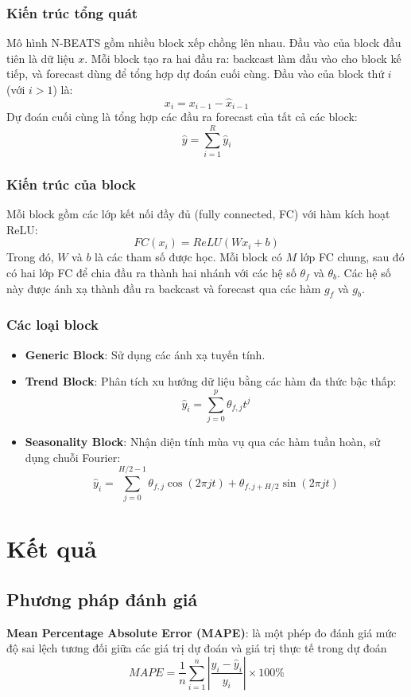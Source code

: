 \documentclass[conference]{IEEEtran}
\begin{document}
\subsubsection{Kiến trúc tổng quát}
Mô hình N-BEATS gồm nhiều block xếp chồng lên nhau. Đầu vào của block đầu tiên là dữ liệu $x$. Mỗi block tạo ra hai đầu ra: backcast làm đầu vào cho block kế tiếp, và forecast dùng để tổng hợp dự đoán cuối cùng. Đầu vào của block thứ $i$ (với $i > 1$) là:
\[
    x_i = x_{i-1} - \hat{x}_{i-1}
\]
Dự đoán cuối cùng là tổng hợp các đầu ra forecast của tất cả các block:
\[
    \hat{y} = \sum_{i=1}^{R} \hat{y}_i
\]

\subsubsection{Kiến trúc của block}
Mỗi block gồm các lớp kết nối đầy đủ (fully connected, FC) với hàm kích hoạt ReLU:
\[
    FC(x_i) = ReLU(Wx_i + b)
\]
Trong đó, $W$ và $b$ là các tham số được học. Mỗi block có $M$ lớp FC chung, sau đó có hai lớp FC để chia đầu ra thành hai nhánh với các hệ số $\theta_f$ và $\theta_b$. Các hệ số này được ánh xạ thành đầu ra backcast và forecast qua các hàm $g_f$ và $g_b$.

\subsubsection{Các loại block}
\begin{itemize}
    \item \textbf{Generic Block}: Sử dụng các ánh xạ tuyến tính.
    \item \textbf{Trend Block}: Phân tích xu hướng dữ liệu bằng các hàm đa thức bậc thấp:
          \[
              \hat{y}_i = \sum_{j=0}^{p} \theta_{f,j} t^j
          \]
    \item \textbf{Seasonality Block}: Nhận diện tính mùa vụ qua các hàm tuần hoàn, sử dụng chuỗi Fourier:
          \[
              \hat{y}_i = \sum_{j=0}^{H/2 - 1} \theta_{f,j} \cos(2\pi j t) + \theta_{f,j + H/2} \sin(2\pi j t)
          \]
\end{itemize}

\section{Kết quả}
\subsection{Phương pháp đánh giá}
\textbf{Mean Percentage Absolute Error (MAPE)}: là một phép đo đánh giá mức độ sai lệch tương đối giữa các giá trị dự đoán và giá trị thực tế trong dự đoán
\[
    MAPE = \frac{1}{n} \sum_{i=1}^{n} \left| \frac{y_i - \hat{y}_i}{y_i} \right| \times 100\%
\]
\end{document}
